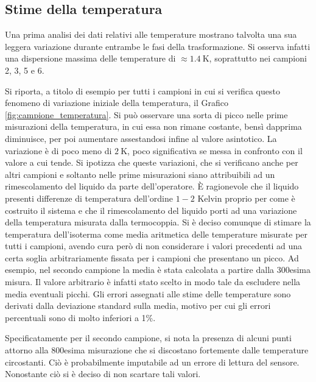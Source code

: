 \documentclass[a4paper,11pt,oneside]{article}
\begin{document}




\subsection{Stime della temperatura}
Una prima analisi dei dati relativi alle temperature mostrano talvolta una sua leggera variazione durante entrambe le fasi della trasformazione. Si osserva infatti una dispersione massima delle temperature di $\approx \SI{1.4}{\kelvin}$, soprattutto nei campioni 2, 3, 5 e 6. 

Si riporta, a titolo di esempio per tutti i campioni in cui si verifica questo fenomeno di variazione iniziale della temperatura, il Grafico \ref{fig:campione_temperatura}. Si può osservare una sorta di picco nelle prime misurazioni della temperatura, in cui essa non rimane costante, bensì dapprima diminuisce, per poi aumentare assestandosi infine al valore asintotico. La variazione è di poco meno di $\SI{2}{\kelvin}$, poco significativa se messa in confronto con il valore a cui tende. %
Si ipotizza che queste variazioni, che si verificano anche per altri campioni e soltanto nelle prime misurazioni siano attribuibili ad un rimescolamento del liquido da parte dell'operatore. È ragionevole che il liquido presenti differenze di temperatura dell'ordine $1-2$ Kelvin proprio per come è costruito il sistema e che il rimescolamento del liquido porti ad una variazione della temperatura misurata dalla termocoppia. 
Si è deciso comunque di stimare la temperatura dell'isoterma come media aritmetica delle temperature misurate per tutti i campioni, avendo cura però di non considerare i valori precedenti ad una certa soglia arbitrariamente fissata per i campioni che presentano un picco. Ad esempio, nel secondo campione la media è stata calcolata a partire dalla 300esima misura. Il valore arbitrario è infatti stato scelto in modo tale da escludere nella media eventuali picchi.  Gli errori assegnati alle stime delle temperature sono derivati dalla deviazione standard sulla media, motivo per cui gli errori percentuali sono di molto inferiori a 1\%.

Specificatamente per il secondo campione, si nota la presenza di alcuni punti attorno alla 800esima misurazione che si discostano fortemente dalle temperature circostanti. Ciò è probabilmente imputabile ad un errore di lettura del sensore. Nonostante ciò si è deciso di non scartare tali valori.
\end{document}
